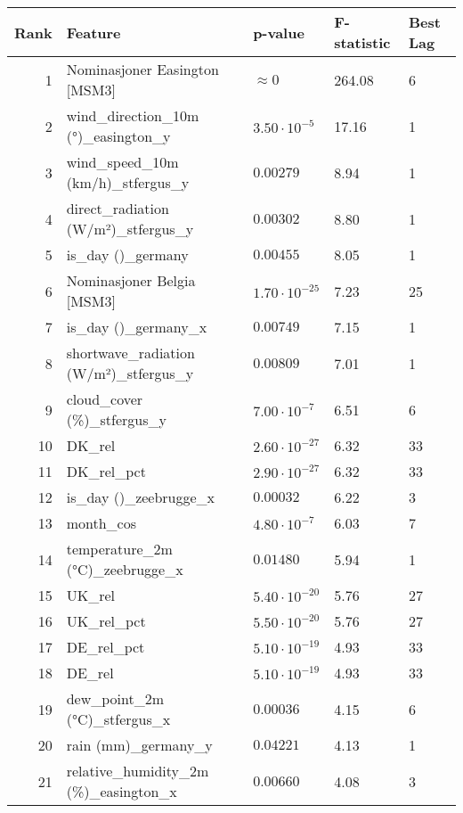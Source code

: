 \begin{table}[H]
    \centering
    \small
    \begin{tabular}{r l l l l}
        \hline
        \textbf{Rank} & \textbf{Feature} & \textbf{p-value} & \textbf{F-statistic} & \textbf{Best Lag} \\
        \hline
        1 & Nominasjoner Easington [MSM3] & $\approx 0$ & 264.08 & 6 \\
        2 & wind\_direction\_10m (°)\_easington\_y & $3.50 \cdot 10^{-5}$ & 17.16 & 1 \\
        3 & wind\_speed\_10m (km/h)\_stfergus\_y & $0.00279$ & 8.94 & 1 \\
        4 & direct\_radiation (W/m²)\_stfergus\_y & $0.00302$ & 8.80 & 1 \\
        5 & is\_day ()\_germany & $0.00455$ & 8.05 & 1 \\
        6 & Nominasjoner Belgia [MSM3] & $1.70 \cdot 10^{-25}$ & 7.23 & 25 \\
        7 & is\_day ()\_germany\_x & $0.00749$ & 7.15 & 1 \\
        8 & shortwave\_radiation (W/m²)\_stfergus\_y & $0.00809$ & 7.01 & 1 \\
        9 & cloud\_cover (\%)\_stfergus\_y & $7.00 \cdot 10^{-7}$ & 6.51 & 6 \\
        10 & DK\_rel & $2.60 \cdot 10^{-27}$ & 6.32 & 33 \\
        11 & DK\_rel\_pct & $2.90 \cdot 10^{-27}$ & 6.32 & 33 \\
        12 & is\_day ()\_zeebrugge\_x & $0.00032$ & 6.22 & 3 \\
        13 & month\_cos & $4.80 \cdot 10^{-7}$ & 6.03 & 7 \\
        14 & temperature\_2m (°C)\_zeebrugge\_x & $0.01480$ & 5.94 & 1 \\
        15 & UK\_rel & $5.40 \cdot 10^{-20}$ & 5.76 & 27 \\
        16 & UK\_rel\_pct & $5.50 \cdot 10^{-20}$ & 5.76 & 27 \\
        17 & DE\_rel\_pct & $5.10 \cdot 10^{-19}$ & 4.93 & 33 \\
        18 & DE\_rel & $5.10 \cdot 10^{-19}$ & 4.93 & 33 \\
        19 & dew\_point\_2m (°C)\_stfergus\_x & $0.00036$ & 4.15 & 6 \\
        20 & rain (mm)\_germany\_y & $0.04221$ & 4.13 & 1 \\
        21 & relative\_humidity\_2m (\%)\_easington\_x & $0.00660$ & 4.08 & 3 \\

\end{tabular}
\end{table}
